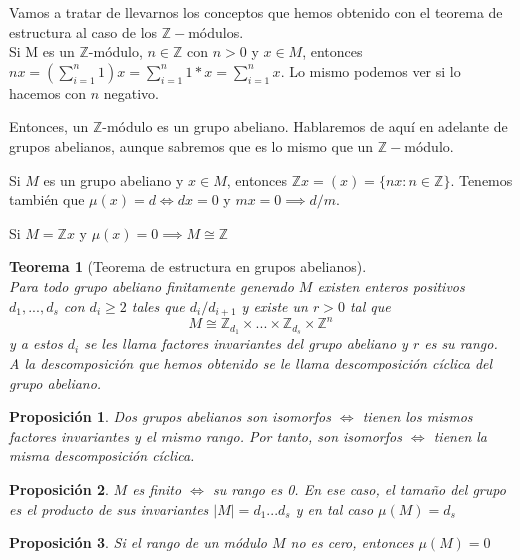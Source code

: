 \documentclass[11pt, a4paper, titlepage]{article}
\providecommand{\ent}{\mathbb{Z}}
\theoremstyle{theorem-style}
\newtheorem*{nth}{Teorema}
\newtheorem*{nprop}{Proposición}
\theoremstyle{definition-style}
\theoremstyle{remark-style}
\theoremstyle{example-style}
\begin{document}
Vamos a tratar de llevarnos los conceptos que hemos obtenido con el teorema de estructura al caso de los $\ent-$módulos.\\
Si M es un $\ent$-módulo, $n\in \ent$ con $n>0$ y $x\in M$, entonces $nx = (\sum_{i=1}^n 1)x = \sum_{i=1}^n 1*x = \sum_{i=1}^n x$. Lo mismo podemos ver si lo hacemos con $n$ negativo.

Entonces, un $\ent$-módulo es un grupo abeliano. Hablaremos de aquí en adelante de grupos abelianos, aunque sabremos que es lo mismo que un $\ent-$módulo.

Si $M$ es un grupo abeliano y $x\in M$, entonces $\ent x = (x) = \{nx : n \in \ent  \}$.
Tenemos también que $\mu(x) = d \iff dx = 0$ y $mx = 0 \implies d/m$.

Si $M=\ent x$ y $\mu(x) = 0 \implies M \cong \ent$

\begin{nth}[Teorema de estructura en grupos abelianos]\hfill \\
	Para todo grupo abeliano finitamente generado $M$ existen enteros positivos $d_1,...,d_s$ con $d_i \geq 2$ tales que $d_i/d_{i+1}$ y existe un $r> 0$ tal que 
	\[
	M \cong \ent_{d_1} \times ... \times \ent_{d_s} \times \ent^n
	\]
	y a estos $d_i$ se les llama factores invariantes del grupo abeliano y $r$ es su rango.
	A la descomposición que hemos obtenido se le llama descomposición cíclica del grupo abeliano.
\end{nth}

\begin{nprop}
	Dos grupos abelianos son isomorfos $\iff$ tienen los mismos factores invariantes y el mismo rango. Por tanto, son isomorfos $\iff$ tienen la misma descomposición cíclica.
\end{nprop}

\begin{nprop}
	$M$ es finito $\iff$ su rango es 0. En ese caso, el tamaño del grupo es el producto de sus invariantes  $|M| = d_1...d_s$ y en tal caso $\mu(M) = d_s$
\end{nprop}
\begin{nprop}
	Si el rango de un módulo $M$ no es cero, entonces $\mu(M) =0$
\end{nprop}
\end{document}

